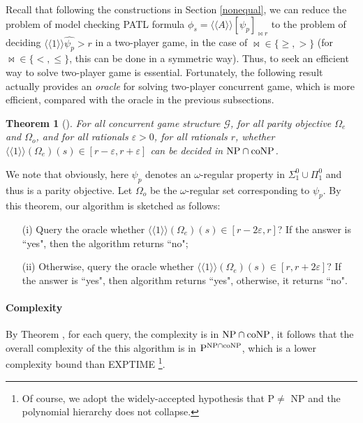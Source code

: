 \documentclass[times, 10 pt,twocolumn]{article}
\newtheorem{theorem}{Theorem}{\bfseries}{\rm}
\newcommand{\mc}[1]{\mathcal{#1}}
\newcommand{\lla}{\langle\langle}
\newcommand{\rra}{\rangle\rangle}
\begin{document}
Recall that following the constructions in Section \ref{nonequal},
we can reduce the problem of model checking PATL formula
$\phi_s=\lla A\rra[\psi_p]_{\bowtie r}$ to the problem of deciding
$\lla 1\rra \widehat{\psi_p} > r$ in a two-player game, in the
case of $\bowtie\in \{\geq, >\}$ (for $\bowtie\in \{<, \leq\}$,
this can be done in a symmetric way). Thus, to seek an efficient
way to solve two-player game is essential. Fortunately, the
following result actually provides an \emph{oracle} for solving
two-player concurrent game, which is more efficient, compared with
the oracle in the previous subsections.

\begin{theorem}[\cite{CdeAH06}] \label{oracle}
  For all concurrent game structure $\mc{G}$, for all parity objective
  $\Omega_e$ and $\Omega_o$, and for all rationals
  $\varepsilon>0$, for all rationals $r$, whether $\lla 1\rra(\Omega_e)(s)\in
  [r-\varepsilon, r+\varepsilon]$ can be decided in ${\rm NP}\cap \mbox{\rm
  coNP}$.
\end{theorem}
We note that obviously, here $\widehat{\psi_p}$ denotes an
$\omega$-regular property in $\Sigma^0_1\cup \Pi^0_1$ and thus is
a parity objective. Let $\Omega_o$ be the $\omega$-regular set
corresponding to $\psi_p$. By this theorem, our algorithm is
sketched as follows:

\begin{itemize}
  \item[(i)] Query the oracle whether $\lla 1\rra(\Omega_e)(s)\in
             [r-2\varepsilon, r]$? If the answer is ``yes", then the
             algorithm returns ``no";

  \item[(ii)] Otherwise, query the oracle whether $\lla
1\rra(\Omega_e)(s)\in [r, r+2\varepsilon]$? If the answer is
``yes", then algorithm returns ``yes", otherwise, it returns
``no".
\end{itemize}

\paragraph{Complexity} By Theorem \label{oracle},
for each query, the complexity is in ${\rm NP}\cap \mbox{\rm
coNP}$, it follows that the overall complexity of the this
algorithm is in ${\rm P}^{{\rm NP}\cap {\rm coNP}}$, which is a
lower complexity bound than E{\small XPTIME} \footnote{Of course,
we adopt the widely-accepted hypothesis that P$\neq$ NP and the
polynomial hierarchy does not collapse.}.
\end{document}
